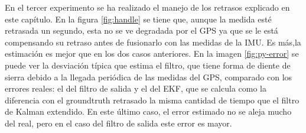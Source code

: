 En el tercer experimento se ha realizado el manejo de los retrasos explicado en este capítulo. En la figura \ref{fig:handle} se tiene que, aunque la medida esté retrasada un segundo, esta no se ve degradada por el GPS ya que se le está compensando su retraso antes de fusionarlo con las medidas de la IMU. Es más,la estimación es mejor que en los dos casos anteriores. En la imagen \ref{fig:py-error} se puede ver la desviación típica que estima el filtro, que tiene forma de diente de sierra debido a la llegada periódica de las medidas del GPS, comparado con los errores reales: el del filtro de salida y el del EKF, que se calcula como la diferencia con el groundtruth retrasado la misma cantidad de tiempo que el filtro de Kalman extendido. En este último caso, el error estimado no se aleja mucho del real, pero en el caso del filtro de salida este error es mayor. 

